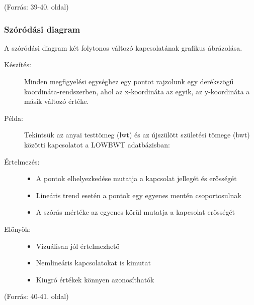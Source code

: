 \documentclass[a4paper,12pt]{article}
\begin{document}
(Forrás: 39-40. oldal)

\subsubsection{Szóródási diagram}

A szóródási diagram két folytonos változó kapcsolatának grafikus ábrázolása.

\begin{description}
\item[Készítés:] Minden megfigyelési egységhez egy pontot rajzolunk egy derékszögű koordináta-rendszerben, ahol az x-koordináta az egyik, az y-koordináta a másik változó értéke.

\item[Példa:] Tekintsük az anyai testtömeg (lwt) és az újszülött születési tömege (bwt) közötti kapcsolatot a LOWBWT adatbázisban:

\begin{center}
\end{center}

\item[Értelmezés:] 
\begin{itemize}
    \item A pontok elhelyezkedése mutatja a kapcsolat jellegét és erősségét
    \item Lineáris trend esetén a pontok egy egyenes mentén csoportosulnak
    \item A szórás mértéke az egyenes körül mutatja a kapcsolat erősségét
\end{itemize}

\item[Előnyök:]
\begin{itemize}
    \item Vizuálisan jól értelmezhető
    \item Nemlineáris kapcsolatokat is kimutat
    \item Kiugró értékek könnyen azonosíthatók
\end{itemize}
\end{description}

(Forrás: 40-41. oldal)
\end{document}
